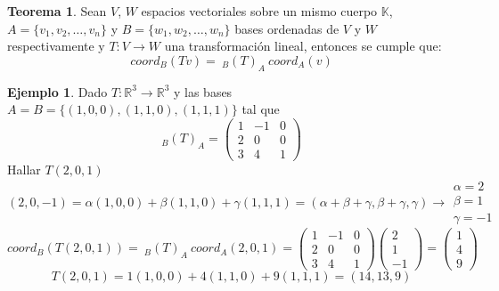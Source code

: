 \documentclass[10pt]{article}
\theoremstyle{definition}
\newtheorem{theorem}{Teorema}[section]
\newtheorem{example}{Ejemplo}[section]
\begin{document}
\begin{theorem}
	Sean $V$, $W$ espacios vectoriales sobre un mismo cuerpo $\mathbb{K}$, $A=\{v_1,v_2,\dots,v_n\}$ y $B=\{w_1,w_2,\dots,w_n\}$ bases ordenadas de $V$ y $W$ respectivamente y $T:V\rightarrow W$ una transformación lineal, entonces se cumple que:
	$$coord_B(Tv)=\ _B(T)_A\ coord_A(v)$$
\end{theorem}
\begin{example}
	Dado $T:\mathbb{R}^3\rightarrow\mathbb{R}^3$ y las bases $A=B=\{(1,0,0),(1,1,0),(1,1,1)\}$ tal que
	$$ _B(T)_A=\begin{pmatrix} 1 & -1 & 0 \\ 2 & 0 & 0 \\ 3 & 4 & 1 \end{pmatrix}$$
	Hallar $T(2,0,1)$
	$$(2,0,-1)=\alpha(1,0,0)+\beta(1,1,0)+\gamma(1,1,1)=(\alpha+\beta+\gamma,\beta+\gamma,\gamma)\rightarrow\begin{matrix}\alpha=2 \\ \beta=1 \\ \gamma = -1\end{matrix}$$
	$$
		coord_B(T(2,0,1))=\ _B(T)_A \ coord_A(2,0,1)=\begin{pmatrix} 1&-1&0 \\2 & 0 & 0 \\ 3 & 4 & 1\end{pmatrix} \begin{pmatrix}2\\1\\-1\end{pmatrix}=\begin{pmatrix}1\\4\\9\end{pmatrix}
	$$
	$$
		T(2,0,1)=1(1,0,0)+4(1,1,0)+9(1,1,1)=(14,13,9)
	$$
\end{example}\newpage
\end{document}
